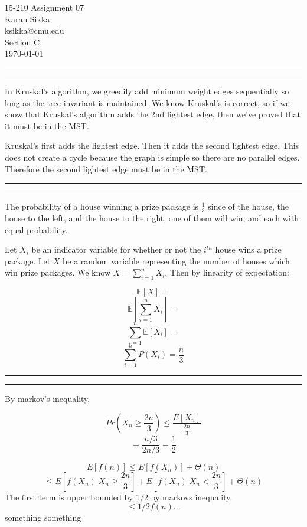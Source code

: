 \documentclass[11pt,letterpaper]{article}
\makeatletter
\newcommand{\question}[2] {\vspace{.25in} \hrule\vspace{0.5em}
\noindent{\bf #1: #2} \vspace{0.5em}
\hrule \vspace{.10in}}
\newcommand{\myname}{Karan Sikka}
\newcommand{\myandrew}{ksikka@cmu.edu}
\newcommand{\myhwnum}{07}
\makeatother
\begin{document}
\medskip

\thispagestyle{plain}
\begin{center}                  %
{\Large 15-210 Assignment \myhwnum} \\
\myname \\
\myandrew \\
Section C\\
\today\\
\end{center}

\question{1}{Task 3.1}
In Kruskal's algorithm, we greedily add minimum weight edges sequentially so long as the
tree invariant is maintained. We know Kruskal's is correct, so if we show that Kruskal's
algorithm adds the 2nd lightest edge, then we've proved that it must be in the MST.

Kruskal's first adds the lightest edge. Then it adds the second lightest edge. This 
does not create a cycle because the graph is simple so there are no parallel edges.
Therefore the second lightest
edge must be in the MST.


\question{2}{Task 3.2}
The probability of a house winning a prize package is $\frac{1}{3}$
since of the house, the house to the left, and the house to the right,
one of them will win, and each with equal probability.

Let $X_i$ be an indicator variable for whether or not the $i^{th}$ house wins a prize package.
Let $X$ be a random variable representing the number of houses which win prize
packages. We know $X = \sum_{i = 1}^{n} X_i$. Then by linearity of expectation:

$$\mathbb{E}[X] = $$
$$\mathbb{E}[\sum_{i = 1}^{n} X_i] = $$
$$\sum_{i = 1}^{n} \mathbb{E}[X_i] = $$
$$\sum_{i = 1}^{n} P(X_i) = \frac{n}{3}$$


\question{3}{Task 3.3}
By markov's inequality,

$$Pr(X_n \geq \frac{2n}{3}) \leq \frac{E[X_n]}{\frac{2n}{3}}  $$
$$ = \frac{n/3}{2n/3} = \frac{1}{2} $$

$$ E[f(n)] \leq E[f(X_n)] + \Theta(n)$$
$$ \leq E[f(X_n) | X_n \geq \frac{2n}{3}] + E[f(X_n) | X_n < \frac{2n}{3}] + \Theta(n)$$
The first term is upper bounded by 1/2 by markovs inequality.
$$ \leq 1/2 f(n)... $$
something something
\end{document}
